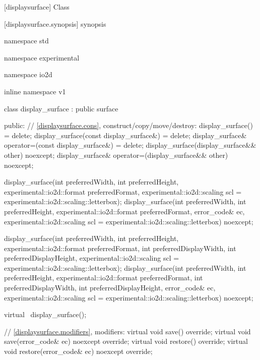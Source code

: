  [displaysurface] {Class }

 [displaysurface.synopsis] { synopsis}

\begin{codeblock}
namespace std { namespace experimental { namespace io2d { inline namespace v1 {
  class display_surface : public surface {
  public:
    // \ref{displaysurface.cons}, construct/copy/move/destroy:
    display_surface() = delete;
    display_surface(const display_surface&) = delete;
    display_surface& operator=(const display_surface&) = delete;
    display_surface(display_surface&& other) noexcept;
    display_surface& operator=(display_surface&& other) noexcept;
    
    display_surface(int preferredWidth, int preferredHeight, 
      experimental::io2d::format preferredFormat,
      experimental::io2d::scaling scl = experimental::io2d::scaling::letterbox);
    display_surface(int preferredWidth, int preferredHeight, 
      experimental::io2d::format preferredFormat, error_code& ec,
      experimental::io2d::scaling scl = experimental::io2d::scaling::letterbox)
      noexcept;
    
    display_surface(int preferredWidth, int preferredHeight, 
      experimental::io2d::format preferredFormat,
      int preferredDisplayWidth, int preferredDisplayHeight,
      experimental::io2d::scaling scl = experimental::io2d::scaling::letterbox);
    display_surface(int preferredWidth, int preferredHeight, 
      experimental::io2d::format preferredFormat,
      int preferredDisplayWidth, int preferredDisplayHeight, error_code& ec,
      experimental::io2d::scaling scl = experimental::io2d::scaling::letterbox) 
      noexcept;
    
    virtual ~display_surface();
    
    // \ref{displaysurface.modifiers}, modifiers:
    virtual void save() override;
    virtual void save(error_code& ec) noexcept override;
    virtual void restore() override;
    virtual void restore(error_code& ec) noexcept override;
    
}}}}}
\end{codeblock}
